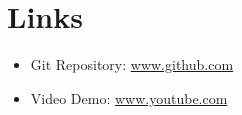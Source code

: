 


\maketitle
\newpage
{}



\section{Links}

\begin{itemize}
    \item Git Repository: \href{https://github.com/SerhiiYahdzhyiev/software-and-ai-project}{www.github.com}
    \item Video Demo: \href{https://youtu.be/mlE1l_f1Vd4}{www.youtube.com}
\end{itemize}






\newpage
\printbibliography


